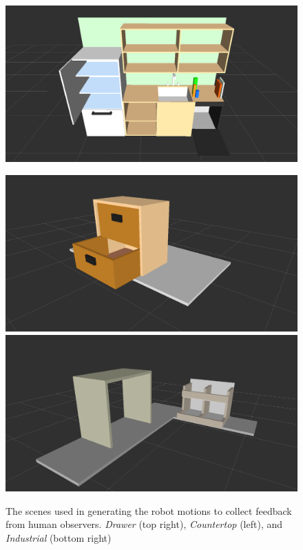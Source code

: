 \documentclass[letterpaper, 10 pt, conference]{ieeeconf}  %
\begin{document}
\begin{figure}[b]
\centering
  \includegraphics[trim = 70mm 0mm 70mm 0mm, width=0.62\columnwidth, clip=true]{pictures/countertop_scene2}
  \begin{minipage}[b][][s]{0.352\columnwidth}
  \centering
    \includegraphics[trim = 70mm 0mm 70mm 0mm, width=\textwidth, clip=true]{pictures/drawer_scene2}
    \vfill
    \includegraphics[trim = 30mm 0mm 30mm 0mm, width=\textwidth, clip=true]{pictures/industrial_scene2}
  \end{minipage}
  \hfill
\caption{The scenes used in generating the robot motions to collect feedback from human observers. \emph{Drawer} (top right), \emph{Countertop} (left), and \emph{Industrial} (bottom right)}\label{fig:scenes}
\end{figure}
\end{document}
